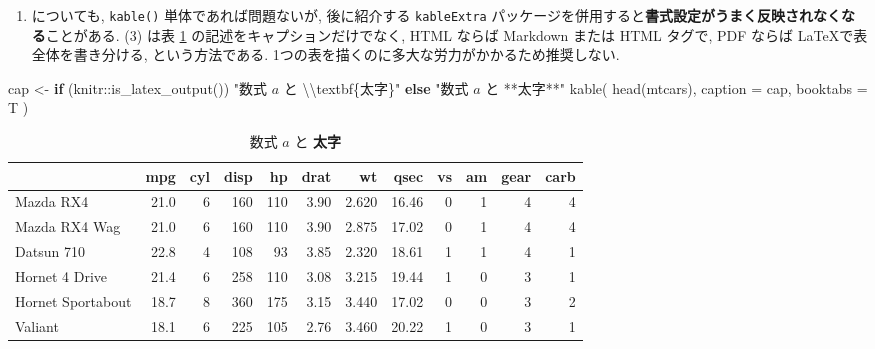 \documentclass[
  xelatex,ja=standard,jafont=noto]{bxjsbook}
\newenvironment{Shaded}{\begin{snugshade}}{\end{snugshade}}
\newcommand{\AttributeTok}[1]{\textcolor[rgb]{0.77,0.63,0.00}{#1}}
\newcommand{\ControlFlowTok}[1]{\textcolor[rgb]{0.13,0.29,0.53}{\textbf{#1}}}
\newcommand{\FunctionTok}[1]{\textcolor[rgb]{0.00,0.00,0.00}{#1}}
\newcommand{\NormalTok}[1]{#1}
\newcommand{\OtherTok}[1]{\textcolor[rgb]{0.56,0.35,0.01}{#1}}
\newcommand{\SpecialCharTok}[1]{\textcolor[rgb]{0.00,0.00,0.00}{#1}}
\newcommand{\StringTok}[1]{\textcolor[rgb]{0.31,0.60,0.02}{#1}}
\providecommand{\tightlist}{%
  \setlength{\itemsep}{0pt}\setlength{\parskip}{0pt}}
\theoremstyle{definition}
\theoremstyle{definition}
\theoremstyle{definition}
\theoremstyle{definition}
\theoremstyle{remark}
\begin{document}
\begin{enumerate}
\def\labelenumi{(\arabic{enumi})}
\setcounter{enumi}{1}
\tightlist
\item
  についても, \texttt{kable()} 単体であれば問題ないが, 後に紹介する
  \texttt{kableExtra}
  パッケージを併用すると\textbf{書式設定がうまく反映されなくなる}ことがある.
  (3) は表 \ref{tab:kable-caption-example}
  の記述をキャプションだけでなく, HTML ならば Markdown または HTML
  タグで, PDF ならば \LaTeX で表全体を書き分ける, という方法である.
  1つの表を描くのに多大な労力がかかるため推奨しない.
\end{enumerate}

\begin{Shaded}
\begin{Highlighting}[numbers=left,,]
\NormalTok{cap }\OtherTok{\textless{}{-}} \ControlFlowTok{if}\NormalTok{ (knitr}\SpecialCharTok{::}\FunctionTok{is\_latex\_output}\NormalTok{()) }\StringTok{"数式 $a$ と }\SpecialCharTok{\textbackslash{}\textbackslash{}}\StringTok{textbf\{太字\}"} \ControlFlowTok{else} \StringTok{"数式 $a$ と **太字**"}
\FunctionTok{kable}\NormalTok{(}
  \FunctionTok{head}\NormalTok{(mtcars),}
  \AttributeTok{caption =}\NormalTok{ cap,}
  \AttributeTok{booktabs =}\NormalTok{ T}
\NormalTok{)}
\end{Highlighting}
\end{Shaded}

\begin{table}

\caption{\label{tab:kable-caption-example}数式 $a$ と \textbf{太字}}
\centering
\begin{tabular}[t]{lrrrrrrrrrrr}
\toprule
  & mpg & cyl & disp & hp & drat & wt & qsec & vs & am & gear & carb\\
\midrule
Mazda RX4 & 21.0 & 6 & 160 & 110 & 3.90 & 2.620 & 16.46 & 0 & 1 & 4 & 4\\
Mazda RX4 Wag & 21.0 & 6 & 160 & 110 & 3.90 & 2.875 & 17.02 & 0 & 1 & 4 & 4\\
Datsun 710 & 22.8 & 4 & 108 & 93 & 3.85 & 2.320 & 18.61 & 1 & 1 & 4 & 1\\
Hornet 4 Drive & 21.4 & 6 & 258 & 110 & 3.08 & 3.215 & 19.44 & 1 & 0 & 3 & 1\\
Hornet Sportabout & 18.7 & 8 & 360 & 175 & 3.15 & 3.440 & 17.02 & 0 & 0 & 3 & 2\\
\addlinespace
Valiant & 18.1 & 6 & 225 & 105 & 2.76 & 3.460 & 20.22 & 1 & 0 & 3 & 1\\
\bottomrule
\end{tabular}
\end{table}
\end{document}
